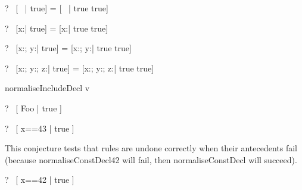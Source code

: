 \begin{zed}
  \vdash?~ [~ | true] = [~ | true \land true]
\end{zed}

\begin{zed}
  \vdash?~ [x:\nat | true] = [x:\nat | true \land true]
\end{zed}

\begin{zed}
  \vdash?~ [x:\nat ; y:\nat | true] = [x:\nat ; y:\nat | true \land true]
\end{zed}

\begin{zed}
  \vdash?~ [x:\nat ; y:\nat ; z:\nat | true] =
           [x:\nat ; y:\nat ; z:\nat | true \land true]
\end{zed}



\begin{zedrule}{normaliseIncludeDecl}
   v \hasDefn [D1 | P1] \\
\derives
   [v; D | true] \unfoldsTo [D1 | P1 \land P2]
\end{zedrule}

\begin{zed}
  \vdash?~ [ Foo | true ] 
\end{zed}


\begin{zed}
  \vdash?~ [ x==43 | true ] \unfoldsTo [ x:\{43\} | true ]
\end{zed}

This conjecture tests that rules are undone correctly when their
antecedents fail (because normaliseConstDecl42 will fail, then
normaliseConstDecl will succeed).
\begin{zed}
  \vdash?~ [ x==42 | true ] \unfoldsTo [ x:\{42\} | true ]
\end{zed}